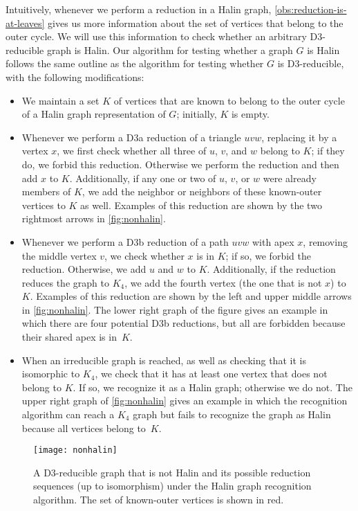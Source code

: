 \documentclass{article}
\begin{document}
Intuitively, whenever we perform a reduction in a Halin graph, \autoref{obs:reduction-is-at-leaves} gives us more information about the set of vertices that belong to the outer cycle. We will use this information to check whether an arbitrary D3-reducible graph is Halin.
Our algorithm for testing whether a graph $G$ is Halin follows the same outline as the algorithm for testing whether $G$ is D3-reducible, with the following modifications:
\begin{itemize}
\item We maintain a set $K$ of vertices that are known to belong to the outer cycle of a Halin graph representation of $G$; initially, $K$ is empty.
\item Whenever we perform a D3a reduction of a triangle $uvw$, replacing it by a vertex $x$, we first check whether all three of $u$, $v$, and $w$ belong to $K$; if they do, we forbid this reduction.
Otherwise we perform the reduction and then add $x$ to $K$. Additionally, if any one or two of $u$, $v$, or $w$ were already members of $K$, we add the neighbor or neighbors of these known-outer vertices to $K$ as well. Examples of this reduction are shown by the two rightmost arrows in \autoref{fig:nonhalin}.
\item Whenever we perform a D3b reduction of a path $uvw$ with apex $x$, removing the middle vertex $v$, we check whether $x$ is in $K$; if so, we forbid the reduction. Otherwise, we add $u$ and $w$ to $K$. Additionally, if the reduction reduces the graph to $K_4$, we add the fourth vertex (the one that is not $x$) to $K$. Examples of this reduction are shown by the left and upper middle arrows in \autoref{fig:nonhalin}. The lower right graph of the figure gives an example in which there are four potential D3b reductions, but all are forbidden because their shared apex is in~$K$.
\item When an irreducible graph is reached, as well as checking that it is isomorphic to $K_4$, we check that it has at least one vertex that does not belong to $K$. If so, we recognize it as a Halin graph; otherwise we do not. The upper right graph of \autoref{fig:nonhalin} gives an example in which the recognition algorithm can reach a $K_4$ graph but fails to recognize the graph as Halin because all vertices belong to~$K$.
\end{itemize}

\begin{figure}[t]
\centering
\texttt{[image: nonhalin]}
\caption{A D3-reducible graph that is not Halin and its possible reduction sequences (up to isomorphism) under the Halin graph recognition algorithm. The set of known-outer vertices is shown in red.}
\label{fig:nonhalin}
\end{figure}
\end{document}
